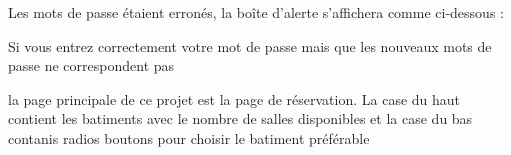 \documentclass{article}
\begin{document}
\begin{enumerate}
 
  Les mots de passe étaient erronés, la boîte d'alerte s'affichera comme ci-dessous :
  
   
  \vspace{0.7cm}
   
\hspace*{-0.7in}

               \noindent{}  
               
  
  
  Si vous entrez correctement votre mot de passe mais que les nouveaux mots de passe ne correspondent pas
  \vspace{0.7cm}
   
\hspace*{-0.7in}

               \noindent{}  
               
  
  la page principale de ce projet est la page de réservation. La case du haut contient les batiments avec le nombre de salles disponibles et la case du bas contanis radios boutons pour choisir le batiment préférable
  

\end{enumerate}
\end{document}
